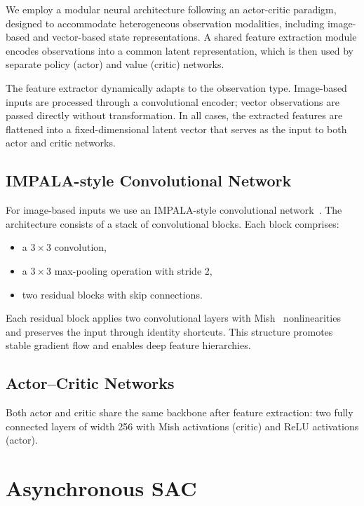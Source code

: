 \documentclass{article}
\begin{document}
We employ a modular neural architecture following an actor-critic paradigm,
designed to accommodate heterogeneous observation modalities, including
image-based and vector-based state representations. A shared feature extraction
module encodes observations into a common latent representation, which is then
used by separate policy (actor) and value (critic) networks.

The feature extractor dynamically adapts to the observation type.
Image-based inputs are processed through a convolutional encoder;
vector observations are passed directly without transformation.
In all cases, the extracted features are flattened into a fixed-dimensional
latent vector that serves as the input to both actor and critic networks.

\subsection*{IMPALA-style Convolutional Network}

For image-based inputs we use an IMPALA-style convolutional
network~\citep{espeholt2018impala}. The architecture consists of a stack of
convolutional blocks. Each block comprises:
\begin{itemize}
  \item a $3\times3$ convolution,
  \item a $3\times3$ max-pooling operation with stride 2,
  \item two residual blocks with skip connections.
\end{itemize}
Each residual block applies two convolutional layers with Mish~\citep{misra2019mish}
nonlinearities and preserves the input through identity shortcuts.
This structure promotes stable gradient flow and enables deep feature
hierarchies.

\subsection*{Actor--Critic Networks}

Both actor and critic share the same backbone after feature extraction:
two fully connected layers of width 256 with Mish activations (critic)
and ReLU activations (actor).

\section{Asynchronous SAC}
\label{app:async_sac}
\end{document}
